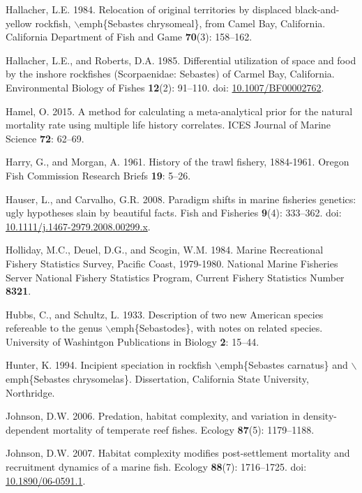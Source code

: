 \documentclass[12pt,]{article}
\begin{document}
\hypertarget{ref-Hallacher1984}{}
Hallacher, L.E. 1984. Relocation of original territories by displaced
black-and-yellow rockfish, \(\backslash\)emph\{Sebastes chrysomeal\},
from Camel Bay, California. California Department of Fish and Game
\textbf{70}(3): 158--162.

\hypertarget{ref-Hallacher1985}{}
Hallacher, L.E., and Roberts, D.A. 1985. Differential utilization of
space and food by the inshore rockfishes (Scorpaenidae: Sebastes) of
Carmel Bay, California. Environmental Biology of Fishes \textbf{12}(2):
91--110. doi:
\href{https://doi.org/10.1007/BF00002762}{10.1007/BF00002762}.

\hypertarget{ref-Hamel2015}{}
Hamel, O. 2015. A method for calculating a meta-analytical prior for the
natural mortality rate using multiple life history correlates. ICES
Journal of Marine Science \textbf{72}: 62--69.

\hypertarget{ref-Harry1961}{}
Harry, G., and Morgan, A. 1961. History of the trawl fishery, 1884-1961.
Oregon Fish Commission Research Briefs \textbf{19}: 5--26.

\hypertarget{ref-Hauser2008}{}
Hauser, L., and Carvalho, G.R. 2008. Paradigm shifts in marine fisheries
genetics: ugly hypotheses slain by beautiful facts. Fish and Fisheries
\textbf{9}(4): 333--362. doi:
\href{https://doi.org/10.1111/j.1467-2979.2008.00299.x}{10.1111/j.1467-2979.2008.00299.x}.

\hypertarget{ref-Holliday1984}{}
Holliday, M.C., Deuel, D.G., and Scogin, W.M. 1984. Marine Recreational
Fishery Statistics Survey, Pacific Coast, 1979-1980. National Marine
Fisheries Server National Fishery Statistics Program, Current Fishery
Statistics Number \textbf{8321}.

\hypertarget{ref-Hubbs1933}{}
Hubbs, C., and Schultz, L. 1933. Description of two new American species
refereable to the genus \(\backslash\)emph\{Sebastodes\}, with notes on
related species. University of Washintgon Publications in Biology
\textbf{2}: 15--44.

\hypertarget{ref-Hunter1994}{}
Hunter, K. 1994. Incipient speciation in rockfish
\(\backslash\)emph\{Sebastes carnatus\} and \(\backslash\)emph\{Sebastes
chrysomelas\}. Dissertation, California State University, Northridge.

\hypertarget{ref-Johnson2006}{}
Johnson, D.W. 2006. Predation, habitat complexity, and variation in
density-dependent mortality of temperate reef fishes. Ecology
\textbf{87}(5): 1179--1188.

\hypertarget{ref-Johnson2007}{}
Johnson, D.W. 2007. Habitat complexity modifies post-settlement
mortality and recruitment dynamics of a marine fish. Ecology
\textbf{88}(7): 1716--1725. doi:
\href{https://doi.org/10.1890/06-0591.1}{10.1890/06-0591.1}.
\end{document}
